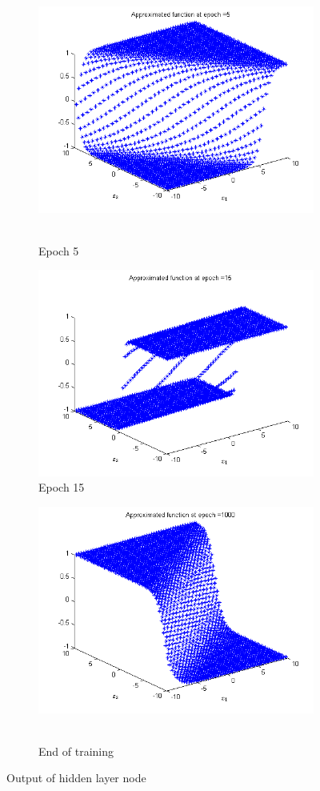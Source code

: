 \documentclass{article}
\begin{document}
\begin{figure}
  \begin{subfigure}{.5\textwidth}
  \centering
  \includegraphics[width=.8\linewidth]{Regression/bivariate/hidden_1layer_5.png}\
  \caption{Epoch 5}
\end{subfigure}%
\begin{subfigure}{.5\textwidth}
  \centering
  \includegraphics[width=.8\linewidth]{Regression/bivariate/hidden_1layer_15.png}
   \caption{Epoch 15}
  \end{subfigure}
  
  \begin{subfigure}{.5\textwidth}
  \centering
  \includegraphics[width=.8\linewidth]{Regression/bivariate/hidden_1layer_1000.png}\
  \caption{End of training}
\end{subfigure}%
  
\caption{Output of hidden layer node}
\end{figure}
\end{document}
